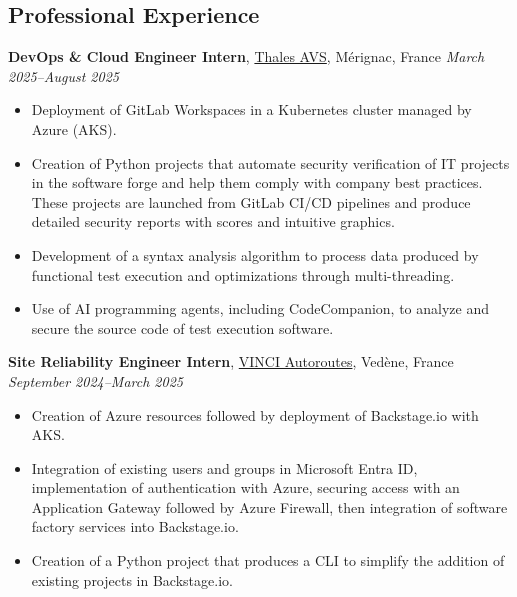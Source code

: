 \documentclass[margin,line]{../res}
\begin{document}
\begin{resume}
  \section{\sc Professional Experience}
  {\bf DevOps \& Cloud Engineer Intern},
  \href{https://www.thalesgroup.com/fr}{Thales AVS}, Mérignac, France
  \hfill {\it March 2025--August 2025}
  \vspace*{.05in}
  \begin{itemize}
    \item Deployment of GitLab Workspaces in a Kubernetes cluster
      managed by Azure (AKS).
    \item Creation of Python projects that automate security verification
      of IT projects in the software forge and help them comply with
      company best practices. These projects are launched from GitLab
      CI/CD pipelines and produce detailed security reports with
      scores and intuitive graphics.
    \item Development of a syntax analysis algorithm to process
      data produced by functional test execution and optimizations
      through multi-threading.
    \item Use of AI programming agents, including CodeCompanion,
      to analyze and secure the source code of test execution software.
  \end{itemize}

  {\bf Site Reliability Engineer Intern},
  \href{https://www.vinci-autoroutes.com}{VINCI Autoroutes}, Vedène, France
  \hfill {\it September 2024--March 2025}
  \vspace*{.05in}
  \begin{itemize}
    \item Creation of Azure resources followed by deployment of
      Backstage.io with AKS.
    \item Integration of existing users and groups in Microsoft
      Entra ID, implementation of authentication with Azure, securing
      access with an Application Gateway
      followed by Azure Firewall, then integration of software factory
      services into Backstage.io.
    \item Creation of a Python project that produces a CLI to
      simplify the addition of existing projects in Backstage.io.
  \end{itemize}


\end{resume}
\end{document}
